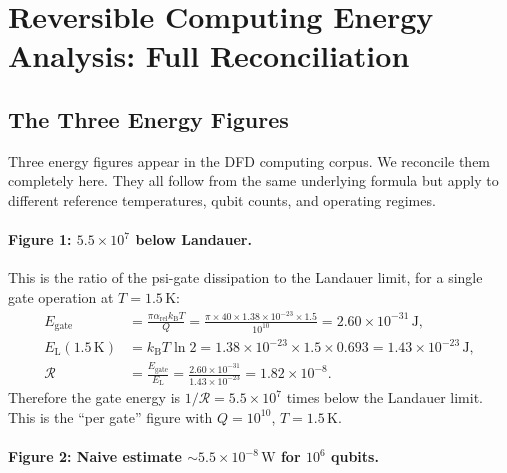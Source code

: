 \documentclass[11pt]{article}
\theoremstyle{definition}
\theoremstyle{remark}
\newcommand{\kB}{k_{\mathrm{B}}}
\newcommand{\EL}{E_{\mathrm{L}}}
\newcommand{\arel}{\alpha_{\mathrm{rel}}}
\begin{document}
\section{Reversible Computing Energy Analysis: Full Reconciliation}
\label{sec:energy_reconciliation}

\subsection{The Three Energy Figures}
\label{sec:three_figures}

Three energy figures appear in the DFD computing corpus. We reconcile them
completely here. They all follow from the same underlying formula but apply
to different reference temperatures, qubit counts, and operating regimes.

\paragraph{Figure 1: $5.5\times10^7$ below Landauer.}
This is the ratio of the psi-gate dissipation to the Landauer limit,
for a single gate operation at $T = 1.5\,\mathrm{K}$:
\begin{align}
E_{\mathrm{gate}} &= \frac{\pi\arel \kB T}{Q}
= \frac{\pi\times40\times1.38\times10^{-23}\times1.5}{10^{10}}
= 2.60\times10^{-31}\,\mathrm{J}, \label{eq:egate} \\
\EL(1.5\,\mathrm{K}) &= \kB T\ln 2
= 1.38\times10^{-23}\times1.5\times0.693
= 1.43\times10^{-23}\,\mathrm{J}, \label{eq:el} \\
\mathcal{R} &= \frac{E_{\mathrm{gate}}}{\EL}
= \frac{2.60\times10^{-31}}{1.43\times10^{-23}}
= 1.82\times10^{-8}. \label{eq:ratio}
\end{align}
Therefore the gate energy is $1/\mathcal{R} = 5.5\times10^7$ times below
the Landauer limit. This is the ``per gate'' figure with $Q = 10^{10}$,
$T = 1.5\,\mathrm{K}$.

\paragraph{Figure 2: Naive estimate $\sim5.5\times10^{-8}\,\mathrm{W}$
for $10^6$ qubits.}
\end{document}
